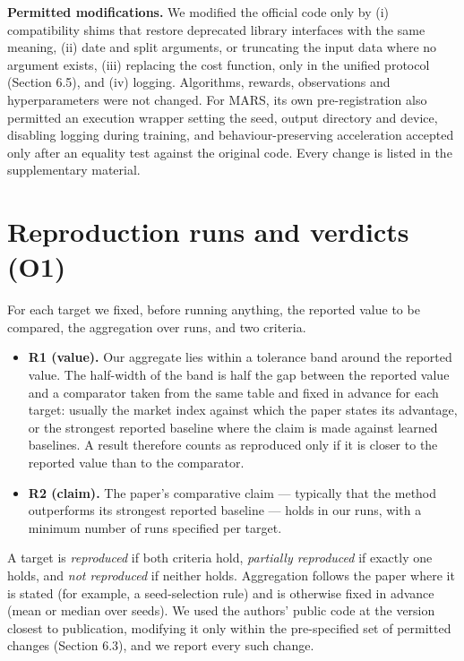 \documentclass[12pt,a4paper]{report}
\providecommand{\tightlist}{\setlength{\itemsep}{0pt}\setlength{\parskip}{0pt}}
\begin{document}
\textbf{Permitted modifications.} We modified the official code only by
(i) compatibility shims that restore deprecated library interfaces with
the same meaning, (ii) date and split arguments, or truncating the input
data where no argument exists, (iii) replacing the cost function, only
in the unified protocol (Section 6.5), and (iv) logging. Algorithms,
rewards, observations and hyperparameters were not changed. For MARS,
its own pre-registration also permitted an execution wrapper setting the
seed, output directory and device, disabling logging during training,
and behaviour-preserving acceleration accepted only after an equality
test against the original code. Every change is listed in the
supplementary material.

\section{Reproduction runs and verdicts
(O1)}\label{reproduction-runs-and-verdicts-o1}

For each target we fixed, before running anything, the reported value to
be compared, the aggregation over runs, and two criteria.

\begin{itemize}
\tightlist
\item
  \textbf{R1 (value).} Our aggregate lies within a tolerance band around
  the reported value. The half-width of the band is half the gap between
  the reported value and a comparator taken from the same table and
  fixed in advance for each target: usually the market index against
  which the paper states its advantage, or the strongest reported
  baseline where the claim is made against learned baselines. A result
  therefore counts as reproduced only if it is closer to the reported
  value than to the comparator.
\item
  \textbf{R2 (claim).} The paper's comparative claim --- typically that
  the method outperforms its strongest reported baseline --- holds in
  our runs, with a minimum number of runs specified per target.
\end{itemize}

A target is \emph{reproduced} if both criteria hold, \emph{partially
reproduced} if exactly one holds, and \emph{not reproduced} if neither
holds. Aggregation follows the paper where it is stated (for example, a
seed-selection rule) and is otherwise fixed in advance (mean or median
over seeds). We used the authors' public code at the version closest to
publication, modifying it only within the pre-specified set of permitted
changes (Section 6.3), and we report every such change.
\end{document}
